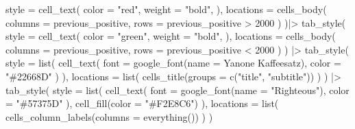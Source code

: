 \documentclass[
]{article}
\newenvironment{Shaded}{\begin{snugshade}}{\end{snugshade}}
\newcommand{\AttributeTok}[1]{\textcolor[rgb]{0.77,0.63,0.00}{#1}}
\newcommand{\DecValTok}[1]{\textcolor[rgb]{0.00,0.00,0.81}{#1}}
\newcommand{\FunctionTok}[1]{\textcolor[rgb]{0.00,0.00,0.00}{#1}}
\newcommand{\NormalTok}[1]{#1}
\newcommand{\SpecialCharTok}[1]{\textcolor[rgb]{0.00,0.00,0.00}{#1}}
\newcommand{\StringTok}[1]{\textcolor[rgb]{0.31,0.60,0.02}{#1}}
\begin{document}
\begin{Shaded}
\begin{Highlighting}[]
    \AttributeTok{style =} \FunctionTok{cell\_text}\NormalTok{(}
      \AttributeTok{color =} \StringTok{"red"}\NormalTok{,}
      \AttributeTok{weight =} \StringTok{"bold"}\NormalTok{,}
\NormalTok{    ),}
    \AttributeTok{locations =} \FunctionTok{cells\_body}\NormalTok{(}
      \AttributeTok{columns =}\NormalTok{ previous\_positive,}
      \AttributeTok{rows =}\NormalTok{ previous\_positive }\SpecialCharTok{\textgreater{}} \DecValTok{2000}
\NormalTok{    )}
\NormalTok{  )}\SpecialCharTok{|\textgreater{}} 
  \FunctionTok{tab\_style}\NormalTok{(}
    \AttributeTok{style =} \FunctionTok{cell\_text}\NormalTok{(}
      \AttributeTok{color =} \StringTok{"green"}\NormalTok{,}
      \AttributeTok{weight =} \StringTok{"bold"}\NormalTok{,}
\NormalTok{    ),}
    \AttributeTok{locations =} \FunctionTok{cells\_body}\NormalTok{(}
      \AttributeTok{columns =}\NormalTok{ previous\_positive,}
      \AttributeTok{rows =}\NormalTok{ previous\_positive }\SpecialCharTok{\textless{}} \DecValTok{2000}
\NormalTok{    )}
\NormalTok{  ) }\SpecialCharTok{|\textgreater{}} 
  \FunctionTok{tab\_style}\NormalTok{(}
      \AttributeTok{style =} \FunctionTok{list}\NormalTok{(}
        \FunctionTok{cell\_text}\NormalTok{(}
          \AttributeTok{font =} \FunctionTok{google\_font}\NormalTok{(}\AttributeTok{name =} \StringTok{\textquotesingle{}Yanone Kaffeesatz\textquotesingle{}}\NormalTok{), }
          \AttributeTok{color =} \StringTok{"\#22668D"}
\NormalTok{        )}
\NormalTok{      ),}
      \AttributeTok{locations =} \FunctionTok{list}\NormalTok{(}
        \FunctionTok{cells\_title}\NormalTok{(}\AttributeTok{groups =} \FunctionTok{c}\NormalTok{(}\StringTok{"title"}\NormalTok{, }\StringTok{"subtitle"}\NormalTok{))}
\NormalTok{      )}
\NormalTok{  ) }\SpecialCharTok{|\textgreater{}} 
  \FunctionTok{tab\_style}\NormalTok{(}
    \AttributeTok{style =} \FunctionTok{list}\NormalTok{(}
      \FunctionTok{cell\_text}\NormalTok{(}
        \AttributeTok{font =} \FunctionTok{google\_font}\NormalTok{(}\AttributeTok{name =} \StringTok{"Righteous"}\NormalTok{),}
        \AttributeTok{color =} \StringTok{"\#57375D"}
\NormalTok{      ),}
      \FunctionTok{cell\_fill}\NormalTok{(}\AttributeTok{color =} \StringTok{"\#F2E8C6"}\NormalTok{)}
\NormalTok{    ),}
    \AttributeTok{locations =} \FunctionTok{list}\NormalTok{(}
      \FunctionTok{cells\_column\_labels}\NormalTok{(}\AttributeTok{columns =} \FunctionTok{everything}\NormalTok{())}
\NormalTok{    )}
\NormalTok{  )}
\end{Highlighting}
\end{Shaded}
\end{document}
